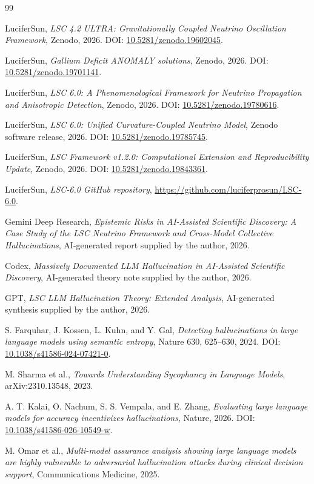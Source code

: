 \documentclass[11pt,a4paper]{article}
\begin{document}
\begin{thebibliography}{99}

LuciferSun, \emph{LSC 4.2 ULTRA: Gravitationally Coupled Neutrino Oscillation Framework}, Zenodo, 2026. DOI: \href{https://doi.org/10.5281/zenodo.19602045}{10.5281/zenodo.19602045}.

LuciferSun, \emph{Gallium Deficit ANOMALY solutions}, Zenodo, 2026. DOI: \href{https://doi.org/10.5281/zenodo.19701141}{10.5281/zenodo.19701141}.

LuciferSun, \emph{LSC 6.0: A Phenomenological Framework for Neutrino Propagation and Anisotropic Detection}, Zenodo, 2026. DOI: \href{https://doi.org/10.5281/zenodo.19780616}{10.5281/zenodo.19780616}.

LuciferSun, \emph{LSC 6.0: Unified Curvature-Coupled Neutrino Model}, Zenodo software release, 2026. DOI: \href{https://doi.org/10.5281/zenodo.19785745}{10.5281/zenodo.19785745}.

LuciferSun, \emph{LSC Framework v1.2.0: Computational Extension and Reproducibility Update}, Zenodo, 2026. DOI: \href{https://doi.org/10.5281/zenodo.19843361}{10.5281/zenodo.19843361}.

LuciferSun, \emph{LSC-6.0 GitHub repository}, \href{https://github.com/luciferprosun/LSC-6.0}{https://github.com/luciferprosun/LSC-6.0}.

Gemini Deep Research, \emph{Epistemic Risks in AI-Assisted Scientific Discovery: A Case Study of the LSC Neutrino Framework and Cross-Model Collective Hallucinations}, AI-generated report supplied by the author, 2026.

Codex, \emph{Massively Documented LLM Hallucination in AI-Assisted Scientific Discovery}, AI-generated theory note supplied by the author, 2026.

GPT, \emph{LSC LLM Hallucination Theory: Extended Analysis}, AI-generated synthesis supplied by the author, 2026.

S. Farquhar, J. Kossen, L. Kuhn, and Y. Gal, \emph{Detecting hallucinations in large language models using semantic entropy}, Nature 630, 625--630, 2024. DOI: \href{https://doi.org/10.1038/s41586-024-07421-0}{10.1038/s41586-024-07421-0}.

M. Sharma et al., \emph{Towards Understanding Sycophancy in Language Models}, arXiv:2310.13548, 2023.

A. T. Kalai, O. Nachum, S. S. Vempala, and E. Zhang, \emph{Evaluating large language models for accuracy incentivizes hallucinations}, Nature, 2026. DOI: \href{https://doi.org/10.1038/s41586-026-10549-w}{10.1038/s41586-026-10549-w}.

M. Omar et al., \emph{Multi-model assurance analysis showing large language models are highly vulnerable to adversarial hallucination attacks during clinical decision support}, Communications Medicine, 2025.

\end{thebibliography}
\end{document}
